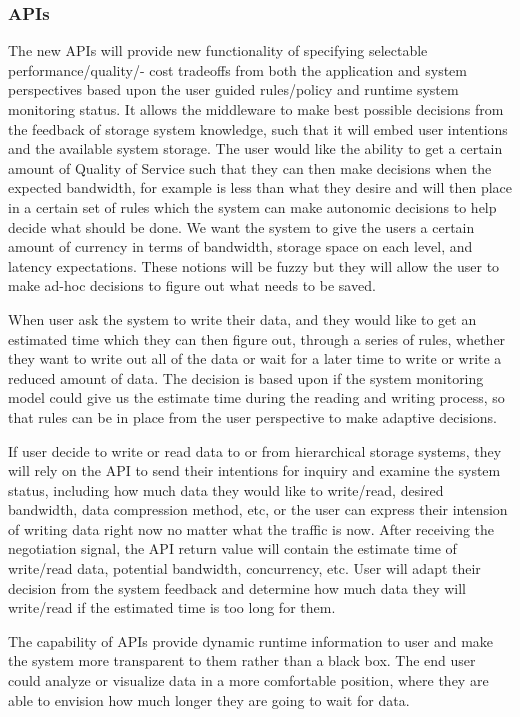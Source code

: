 \subsubsection{APIs}

The new APIs will provide new functionality of specifying selectable performance/quality/- cost tradeoffs from both the application and system perspectives based upon the user guided rules/policy and runtime system monitoring status. It allows the middleware to make best possible decisions from the feedback of storage system knowledge, such that it will embed user intentions and the available system storage. The user would like the ability to get a certain amount of Quality of Service such that they can then make decisions when the expected bandwidth, for example is less than what they desire and will then place in a certain set of rules which the system can make autonomic decisions to help decide what should be done. We want the system to give the users a certain amount of currency in terms of bandwidth, storage space on each level, and latency expectations. These notions will be fuzzy but they will allow the user to make ad-hoc decisions to figure out what needs to be saved.

When user ask the system to write their data, and they would like to get an estimated time which they can then figure out, through a series of rules, whether they want to write out all of the data or wait for a later time to write or write a reduced amount of data. The decision is based upon if the system monitoring model could give us the estimate time during the reading and writing process, so that rules can be in place from the user perspective to make adaptive decisions. 

If user decide to write or read data to or from hierarchical storage systems, they will rely on the API to send their intentions for inquiry and examine the system status, including how much data they would like to write/read, desired bandwidth, data compression method, etc, or the user can express their intension of writing data right now no matter what the traffic is now. After receiving the negotiation signal, the API return value will contain the estimate time of write/read data, potential bandwidth, concurrency, etc. User will adapt their decision from the system feedback and determine how much data they will write/read if the estimated time is too long for them. 

The capability of APIs provide dynamic runtime information to user and make the system more transparent to them rather than a black box. The end user could analyze or visualize data in a more comfortable position, where they are able to envision how much longer they are going to wait for data. 
